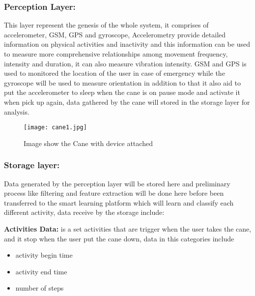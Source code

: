 \documentclass[a4paper, parskip=full]{scrartcl}
\begin{document}
\subsubsection*{Perception Layer:}

This layer represent the genesis of the whole system, it comprises of accelerometer, GSM, GPS and gyroscope, Accelerometry provide detailed information on physical activities and inactivity and this information can be used to measure more comprehensive relationships among movement frequency, intensity and duration, it can also measure vibration intensity. GSM and GPS is used to monitored the location of the user in case of emergency while the gyroscope will be used to measure orientation in addition to that it also aid to put the accelerometer to sleep when the cane is on pause mode and activate it when pick up again, data gathered by the cane will stored in the storage layer for analysis.

\begin{figure}
	\centering
	\texttt{[image: cane1.jpg]}
	
	\caption{Image show the Cane with device attached }
	
\end{figure}



\subsubsection*{Storage layer:} Data generated by the perception layer will be stored here and preliminary process like filtering and feature extraction will be done here before been transferred to the smart learning platform which will learn and classify each different activity, data receive by the storage include:

\textbf{Activities Data:} is a set activities that are trigger when the user takes the cane, and it stop when the user put the cane down, data in this categories include 


\begin{itemize}
	
	\item   activity begin time
	
	\item  activity end time
	
	\item   number of steps	
	
\end{itemize}
\end{document}
